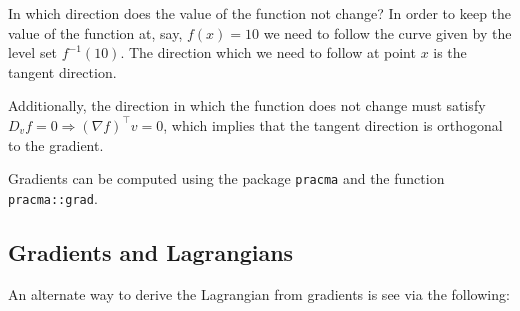 \documentclass[11pt,]{article}
\begin{document}
In which direction does the value of the function not change? In order
to keep the value of the function at, say, \(f(x) = 10\) we need to
follow the curve given by the level set \(f^{-1}(10)\). The direction
which we need to follow at point \(x\) is the tangent direction.

Additionally, the direction in which the function does not change must
satisfy \(D_v f=0\Rightarrow (\nabla f)^{\top}v=0\), which implies that
the tangent direction is orthogonal to the gradient.

Gradients can be computed using the package \texttt{pracma} and the
function \texttt{pracma::grad}.

\subsection{Gradients and Lagrangians}\label{gradients-and-lagrangians}

An alternate way to derive the Lagrangian from gradients is see via the
following:
\end{document}
